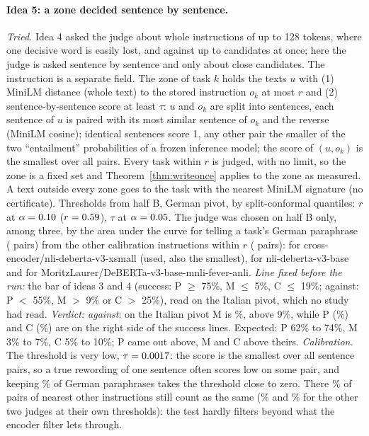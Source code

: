 \paragraph{Idea 5: a zone decided sentence by sentence.} \emph{Tried.} Idea 4 asked the judge about whole instructions of up to 128 tokens, where one decisive word is easily lost, and against up to \WidenJudgeLimit{} candidates at once; here the judge is asked sentence by sentence and only about close candidates. The instruction is a separate field. The zone of task $k$ holds the texts $u$ with (1) MiniLM distance (whole text) to the stored instruction $o_k$ at most $r$ and (2) sentence-by-sentence score at least $\tau$: $u$ and $o_k$ are split into sentences, each sentence of $u$ is paired with its most similar sentence of $o_k$ and the reverse (MiniLM cosine); identical sentences score 1, any other pair the smaller of the two ``entailment'' probabilities of a frozen inference model; the score of $(u, o_k)$ is the smallest over all pairs. Every task within $r$ is judged, with no limit, so the zone is a fixed set and Theorem~\ref{thm:writeonce} applies to the zone as measured. A text outside every zone goes to the task with the nearest MiniLM signature (no certificate). Thresholds from half B, German pivot, by split-conformal quantiles: $r$ at $\alpha = 0.10{}$ ($r = 0.59{}$), $\tau$ at $\alpha = 0.05{}$. The judge was chosen on half B only, among three, by the area under the curve for telling a task's German paraphrase (\WidenSentPositives{} pairs) from the other calibration instructions within $r$ (\WidenSentNegatives{} pairs): \WidenSentAucXsmall{} for cross-encoder/nli-deberta-v3-xsmall (used, also the smallest), \WidenSentAucBase{} for nli-deberta-v3-base and \WidenSentAucMnli{} for MoritzLaurer/DeBERTa-v3-base-mnli-fever-anli.
\emph{Line fixed before the run:} the bar of ideas 3 and 4 (success: \textsf{P} $\ge$ 75\%, \textsf{M} $\le$ 5\%, \textsf{C} $\le$ 19\%; against: \textsf{P} $<$ 55\%, \textsf{M} $>$ 9\% or \textsf{C} $>$ 25\%), read on the Italian pivot, which no study had read. \emph{Verdict: against}: on the Italian pivot \textsf{M} is \WidenSentItM{}\%, above 9\%, while \textsf{P} (\WidenSentItP{}\%) and \textsf{C} (\WidenSentC{}\%) are on the right side of the success lines. Expected: \textsf{P} 62\% to 74\%, \textsf{M} 3\% to 7\%, \textsf{C} 5\% to 10\%; \textsf{P} came out above, \textsf{M} and \textsf{C} above theirs.
\emph{Calibration.} The threshold is very low, $\tau = 0.0017{}$: the score is the smallest over all sentence pairs, so a true rewording of one sentence often scores low on some pair, and keeping \WidenSentPosSameXsmall{}\% of German paraphrases takes the threshold close to zero. There \WidenSentNegSameXsmall{}\% of pairs of nearest other instructions still count as the same (\WidenSentNegSameBase{}\% and \WidenSentNegSameMnli{}\% for the other two judges at their own thresholds): the test hardly filters beyond what the encoder filter lets through.
